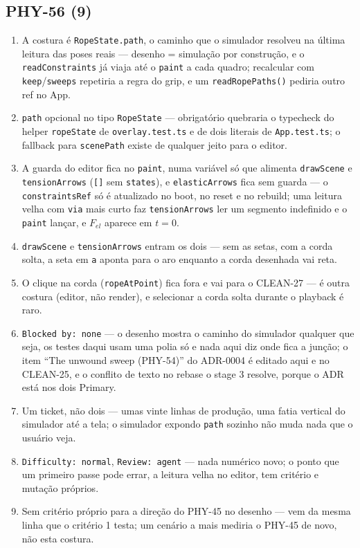 \documentclass[11pt,a4paper]{article}
\begin{document}
{\subsection*{PHY-56 (9)}
\begin{enumerate}
  \item A costura é \texttt{RopeState.path}, o caminho que o simulador
        resolveu na última leitura das poses reais --- desenho = simulação por
        construção, e o \texttt{readConstraints} já viaja até o \texttt{paint}
        a cada quadro; recalcular com \texttt{keep}/\texttt{sweeps} repetiria a
        regra do grip, e um \texttt{readRopePaths()} pediria outro ref no App.
  \item \texttt{path} opcional no tipo \texttt{RopeState} --- obrigatório
        quebraria o typecheck do helper \texttt{ropeState} de
        \texttt{overlay.test.ts} e de dois literais de \texttt{App.test.ts}; o
        fallback para \texttt{scenePath} existe de qualquer jeito para o
        editor.
  \item A guarda do editor fica no \texttt{paint}, numa variável só que
        alimenta \texttt{drawScene} e \texttt{tensionArrows} (\texttt{[]} sem
        \texttt{states}), e \texttt{elasticArrows} fica sem guarda --- o
        \texttt{constraintsRef} só é atualizado no boot, no reset e no rebuild;
        uma leitura velha com \texttt{via} mais curto faz
        \texttt{tensionArrows} ler um segmento indefinido e o \texttt{paint}
        lançar, e $F_{el}$ aparece em $t = 0$.
  \item \texttt{drawScene} e \texttt{tensionArrows} entram os dois --- sem as
        setas, com a corda solta, a seta em \texttt{a} aponta para o aro
        enquanto a corda desenhada vai reta.
  \item O clique na corda (\texttt{ropeAtPoint}) fica fora e vai para o
        CLEAN-27 --- é outra costura (editor, não render), e selecionar a corda
        solta durante o playback é raro.
  \item \texttt{Blocked by: none} --- o desenho mostra o caminho do simulador
        qualquer que seja, os testes daqui usam uma polia só e nada aqui diz
        onde fica a junção; o item ``The unwound sweep (PHY-54)'' do ADR-0004
        é editado aqui e no CLEAN-25, e o conflito de texto no rebase o stage 3
        resolve, porque o ADR está nos dois Primary.
  \item Um ticket, não dois --- umas vinte linhas de produção, uma fatia
        vertical do simulador até a tela; o simulador expondo \texttt{path}
        sozinho não muda nada que o usuário veja.
  \item \texttt{Difficulty: normal}, \texttt{Review: agent} --- nada numérico
        novo; o ponto que um primeiro passe pode errar, a leitura velha no
        editor, tem critério e mutação próprios.
  \item Sem critério próprio para a direção do PHY-45 no desenho --- vem da
        mesma linha que o critério 1 testa; um cenário a mais mediria o PHY-45
        de novo, não esta costura.
\end{enumerate}

}
\end{document}
